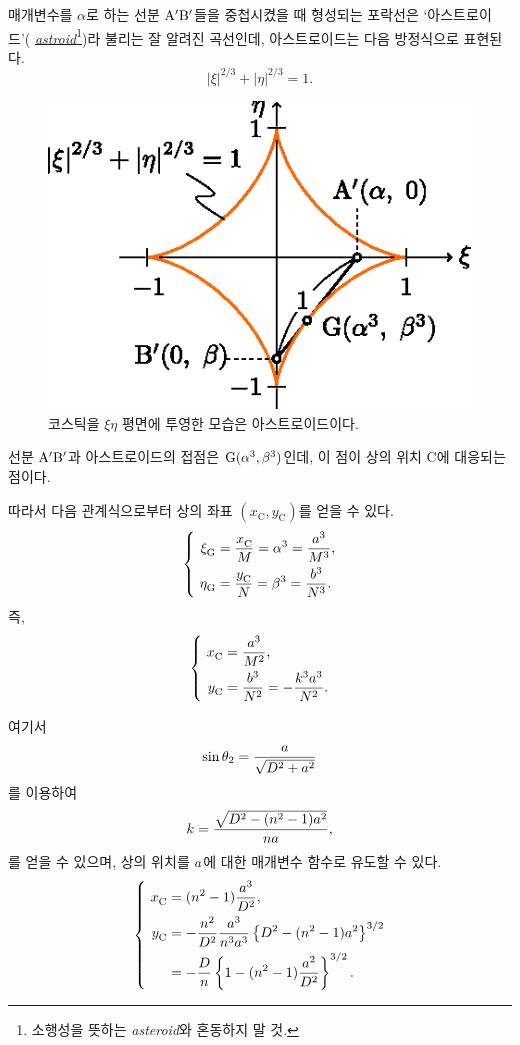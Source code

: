 \documentclass[twocolumn]{article}
\begin{document}
매개변수를 $\alpha$로 하는 선분 ${\mathrm{{A^{\prime}}{B^{\prime}}}}$들을 중첩시켰을 때 형성되는 포락선은 `아스트로이드'(%
\href{https://en.wikipedia.org/wiki/Astroid}{\emph{astroid}}\footnote{
소행성을 뜻하는 \emph{asteroid}와 혼동하지 말 것.})라 불리는 잘 알려진 곡선인데, 아스트로이드는 다음 방정식으로 표현된다.
$$ \left| \xi \right|^{2/3} + \left| \eta \right|^{2/3} = 1. $$

\begin{figure}
	\centering
	\includegraphics{figs/g107.eps}	
	\caption{코스틱을 $\xi\eta$ 평면에 투영한 모습은 아스트로이드이다.}
	\label{fig:astroid}
\end{figure}

선분 ${\mathrm{{A^{\prime}}{B^{\prime}}}}$과
아스트로이드의 접점은 $\mathrm{G}({\alpha}^3, {\beta}^3)$인데, 이 점이 상의 위치 $\mathrm{C}$에 대응되는 점이다.
	
따라서 다음 관계식으로부터 상의 좌표 $(x_{\mathrm{C}}^{}, y_{\mathrm{C}}^{})$를 얻을 수 있다.
$$ \left\{ 
\begin{aligned}
	\xi_{\mathrm{G}}^{} &= \dfrac{x_{\mathrm{C}}^{}}{M} = \greeka^3 = \dfrac{\romana^3}{M^3},\\
	\eta_{\mathrm{G}}^{} &= \dfrac{y_{\mathrm{C}}^{}}{N} = \greekb^3 = \dfrac{\romanb^3}{N^3}.
\end{aligned}
\right.$$
즉,
$$ \left\{ 
\begin{aligned}
	x_{\mathrm{C}}^{} &= \dfrac{\romana^3}{M^2},\\
	y_{\mathrm{C}}^{} &= \dfrac{\romanb^3}{N^2}=-\dfrac{k^3\romana^3}{N^2}.
\end{aligned}
\right.$$

여기서
	$$\sin\theta_2 = \dfrac{{a}}{\sqrt{D^2+{a}^2}}$$
를 이용하여
$$k = \dfrac{\sqrt{D^2-(n^2-1){a}^2}}{n{a}},$$
를 얻을 수 있으며, 
상의 위치를 ${a}$에 대한 매개변수 함수로 유도할 수 있다.
$$ \left\{ 
\begin{aligned}
	x_{\mathrm{C}}^{} &= (n^2-1)\dfrac{\romana^3}{D^2},\\
	y_{\mathrm{C}}^{} &= -\dfrac{n^2}{D^2}\dfrac{\romana^3}
	{n^3\romana^3}\left\{ D^2-(n^2-1)\romana^2 \right\}^{3/2}\\
	&= -\dfrac{D}{n}\left\{ 1-(n^2-1)\dfrac{\romana^2}{D^2} \right\}^{3/2}.
\end{aligned}
\right.$$
	
\end{document}
